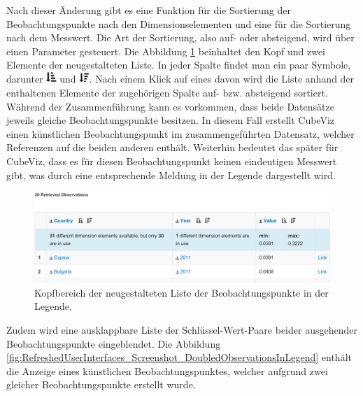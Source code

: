 \documentclass[11pt]{article}
\newcommand{\com}[1]{\marginpar{\em {\small{#1}}}} %
\begin{document}
\noindent
Nach dieser Änderung gibt es eine Funktion für die Sortierung der Beobachtungspunkte nach den Dimensionselementen und eine für die Sortierung nach dem Messwert. Die Art der Sortierung, also auf- oder absteigend, wird über einen Parameter gesteuert. Die Abbildung \ref{fig:RefreshedUserInterfaces_NewObservationList} beinhaltet den Kopf und zwei Elemente der neugestalteten Liste. In jeder Spalte findet man ein paar Symbole, darunter \includegraphics[width=0.38cm]{RefreshedUserInterfaces/sortUp.pdf} und \includegraphics[width=0.38cm]{RefreshedUserInterfaces/sortDown.pdf}. \com{Anforderungen \\ F-70, S. \pageref{req:F70} \\ F-220, S. \pageref{req:F220}}Nach einem Klick auf eines davon wird die Liste anhand der enthaltenen Elemente der zugehörigen Spalte auf- bzw. absteigend sortiert. Während der Zusammenführung kann es vorkommen, dass beide Datensätze jeweils gleiche Beobachtungspunkte besitzen. In diesem Fall erstellt CubeViz einen künstlichen Beobachtungspunkt im zusammengeführten Datensatz, welcher Referenzen auf die beiden anderen enthält. Weiterhin bedeutet das später für CubeViz, dass es für diesen Beobachtungspunkt keinen eindeutigen Messwert gibt, was durch eine entsprechende Meldung in der Legende dargestellt wird.\\

%
%
\begin{figure}[h!]
    \centering
    \includegraphics[width=15.3cm]{RefreshedUserInterfaces/NewObservationList.pdf}
    \caption{Kopfbereich der neugestalteten Liste der Beobachtungspunkte in der Legende.}
    \label{fig:RefreshedUserInterfaces_NewObservationList}
\end{figure}

\noindent
Zudem wird eine ausklappbare Liste der Schlüssel-Wert-Paare beider ausgehender Beobachtungspunkte eingeblendet. Die Abbildung \ref{fig:RefreshedUserInterfaces_Screenshot_DoubledObservationsInLegend} enthält die Anzeige eines künstlichen Beobachtungspunktes, welcher aufgrund zwei gleicher Beobachtungspunkte erstellt wurde.
\end{document}
